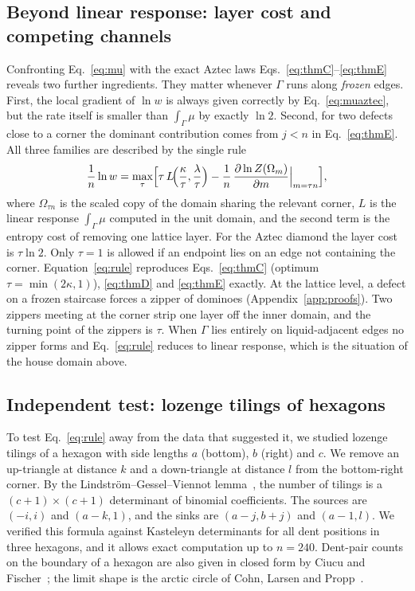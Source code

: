 \documentclass[aps,pre,twocolumn,superscriptaddress,nofootinbib,floatfix]{revtex4-2}
\begin{document}
\subsection{Beyond linear response: layer cost and competing channels}
Confronting Eq.~\eqref{eq:mu} with the exact Aztec laws Eqs.~\eqref{eq:thmC}--\eqref{eq:thmE} reveals two further ingredients. They matter whenever $\Gamma$ runs along \emph{frozen} edges. First, the local gradient of $\ln w$ is always given correctly by Eq.~\eqref{eq:muaztec}, but the rate itself is smaller than $\int_\Gamma\mu$ by exactly $\ln2$. Second, for two defects close to a corner the dominant contribution comes from $j<n$ in Eq.~\eqref{eq:thmE}. All three families are described by the single rule
\begin{equation}
\frac1n\ln w=\max_{\tau}\Bigl[\tau\,L\!\Bigl(\frac\kappa\tau,\frac\lambda\tau\Bigr)-\frac1n\,\frac{\partial\ln Z(\Omega_m)}{\partial m}\Big|_{m=\tau n}\Bigr],
\label{eq:rule}
\end{equation}
where $\Omega_{\tau n}$ is the scaled copy of the domain sharing the relevant corner, $L$ is the linear response $\int_\Gamma\mu$ computed in the unit domain, and the second term is the entropy cost of removing one lattice layer. For the Aztec diamond the layer cost is $\tau\ln2$. Only $\tau=1$ is allowed if an endpoint lies on an edge not containing the corner. Equation~\eqref{eq:rule} reproduces Eqs.~\eqref{eq:thmC} (optimum $\tau=\min(2\kappa,1)$), \eqref{eq:thmD} and \eqref{eq:thmE} exactly. At the lattice level, a defect on a frozen staircase forces a zipper of dominoes (Appendix~\ref{app:proofs}). Two zippers meeting at the corner strip one layer off the inner domain, and the turning point of the zippers is $\tau$. When $\Gamma$ lies entirely on liquid-adjacent edges no zipper forms and Eq.~\eqref{eq:rule} reduces to linear response, which is the situation of the house domain above.

\subsection{Independent test: lozenge tilings of hexagons}
To test Eq.~\eqref{eq:rule} away from the data that suggested it, we studied lozenge tilings of a hexagon with side lengths $a$ (bottom), $b$ (right) and $c$. We remove an up-triangle at distance $k$ and a down-triangle at distance $l$ from the bottom-right corner. By the Lindstr\"om--Gessel--Viennot lemma~\cite{Lindstrom1973,GesselViennot1985}, the number of tilings is a $(c+1)\times(c+1)$ determinant of binomial coefficients. The sources are $(-i,i)$ and $(a-k,1)$, and the sinks are $(a-j,b+j)$ and $(a-1,l)$. We verified this formula against Kasteleyn determinants for all dent positions in three hexagons, and it allows exact computation up to $n=240$. Dent-pair counts on the boundary of a hexagon are also given in closed form by Ciucu and Fischer~\cite{CiucuFischer2016}; the limit shape is the arctic circle of Cohn, Larsen and Propp~\cite{CohnLarsenPropp1998}.
\end{document}
